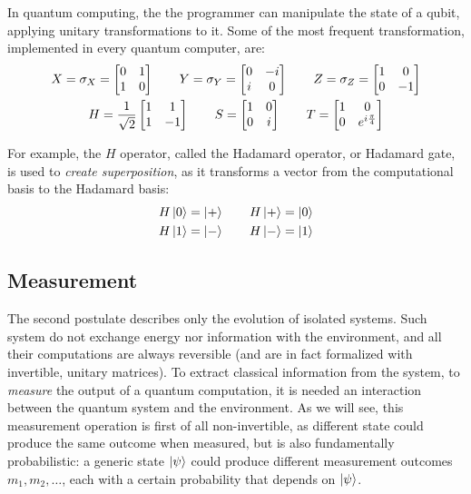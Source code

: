 In quantum computing, the the programmer can manipulate the state of a qubit, applying unitary transformations to it. Some of the most frequent transformation, implemented in every quantum computer, are:
\begin{gather*}
	X = \sigma_X = \begin{bmatrix}
	0 & 1 \\
	1 & 0
	\end{bmatrix} \qquad
	Y = \sigma_Y = \begin{bmatrix}
	0 & -i \\
	i & 0
	\end{bmatrix} \qquad
	Z = \sigma_Z = \begin{bmatrix}
	1 & 0 \\
	0 & -1
	\end{bmatrix} \\ 
	H = \frac{1}{\sqrt{2}}\begin{bmatrix}
	1 & 1 \\
	1 & -1
	\end{bmatrix} \qquad
 	S = \begin{bmatrix}
	1 & 0 \\
	0 & i
	\end{bmatrix}\qquad
	T = \begin{bmatrix}
	1 & 0 \\
	0 & e^{i\frac{\pi}{4}}
	\end{bmatrix} 
\end{gather*}

For example, the $H$ operator, called the Hadamard operator, or Hadamard gate, is used to \textit{create superposition}, as it transforms a vector from the computational basis to the Hadamard basis:
\begin{gather*}
	H\ket{0} = \ket{+} \qquad H\ket{+} = \ket{0}  \\
	H\ket{1} = \ket{-} \qquad H\ket{-} = \ket{1} \\	 
\end{gather*}
\subsection{Measurement}

The second postulate describes only the evolution of isolated systems. Such system do not exchange energy nor information with the environment, and all their computations are always reversible (and are in fact formalized with invertible, unitary matrices). To extract classical information from the system, to \textit{measure} the output of a quantum computation, it is needed an interaction between the quantum system and the environment. As we will see, this measurement operation is first of all non-invertible, as different state could produce the same outcome when measured, but is also fundamentally probabilistic: a generic state $\ket{\psi}$ could produce different measurement outcomes $m_1, m_2,\ldots$, each with a certain probability that depends on $\ket{\psi}$.

